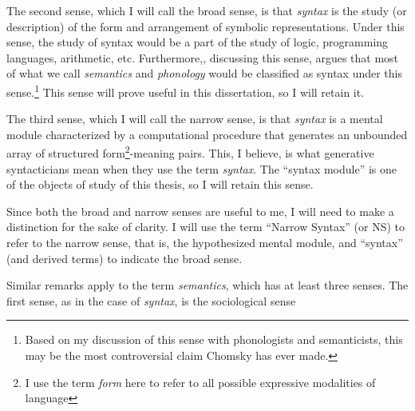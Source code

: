 \documentclass[MilwayThesis]{subfiles}
\begin{document}
The second sense, which I will call the broad sense, is that \textit{syntax} is the study (or description) of the form and arrangement of symbolic representations.
Under this sense, the study of syntax would be a part of the study of logic, programming languages, arithmetic, etc.
Furthermore,\textcite[174]{chomsky2000new}, discussing this sense, argues that most of what we call \textit{semantics} and \textit{phonology} would be classified as syntax under this sense.\footnote{Based on my discussion of this sense with phonologists and semanticists, this may be the most controversial claim Chomsky has ever made.}
This sense will prove useful in this dissertation, so I will retain it.

The third sense, which I will call the narrow sense, is that \textit{syntax} is a mental module characterized by a computational procedure that generates an unbounded array of structured form\footnote{I use the term \textit{form} here to refer to all possible expressive modalities of language}-meaning pairs.
This, I believe, is what generative syntacticians mean when they use the term \textit{syntax}.
The ``syntax module'' is one of the objects of study of this thesis, so I will retain this sense.

Since both the broad and narrow senses are useful to me, I will need to make a distinction for the sake of clarity.
I will use the term ``Narrow Syntax'' (or NS) to refer to the narrow sense, that is, the hypothesized mental module, and ``syntax'' (and derived terms) to indicate the broad sense.

Similar remarks apply to the term \textit{semantics}, which has at least three senses.
The first sense, as in the case of \textit{syntax}, is the sociological sense
\end{document}
